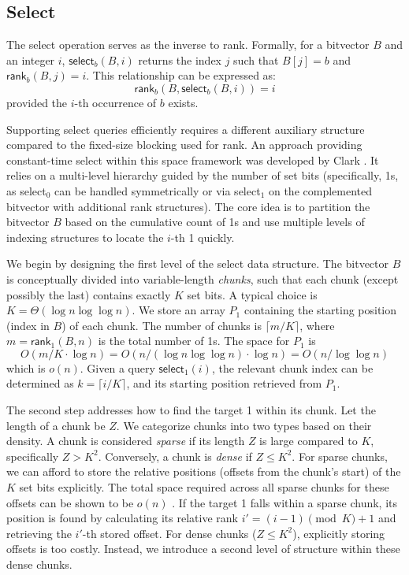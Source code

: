 \subsection{\textsf{Select}} \label{subsec:select}

The \textsf{select} operation serves as the inverse to \textsf{rank}. Formally, for a bitvector $B$ and an integer $i$, $\textsf{select}_b(B, i)$ returns the index $j$ such that $B[j] = b$ and $\textsf{rank}_b(B, j) = i$. This relationship can be expressed as:
\[ \textsf{rank}_b(B, \textsf{select}_b(B, i)) = i \]
provided the $i$-th occurrence of $b$ exists.

Supporting \textsf{select} queries efficiently requires a different auxiliary structure compared to the fixed-size blocking used for \textsf{rank}. An approach providing constant-time select within this space framework was developed by Clark \cite{clark1997compact}. It relies on a multi-level hierarchy guided by the number of set bits (specifically, 1s, as \textsf{select}$_0$ can be handled symmetrically or via \textsf{select}$_1$ on the complemented bitvector with additional rank structures). The core idea is to partition the bitvector $B$ based on the cumulative count of 1s and use multiple levels of indexing structures to locate the $i$-th 1 quickly.

We begin by designing the first level of the select data structure. The bitvector $B$ is conceptually divided into variable-length \emph{chunks}, such that each chunk (except possibly the last) contains exactly $K$ set bits. A typical choice is $K = \Theta(\log n \log \log n)$. We store an array $P_1$ containing the starting position (index in $B$) of each chunk. The number of chunks is $\lceil m/K \rceil$, where $m = \textsf{rank}_1(B, n)$ is the total number of 1s. The space for $P_1$ is
\[O(m/K \cdot \log n) = O(n / (\log n \log \log n) \cdot \log n) = O(n / \log \log n)\]
which is $o(n)$. Given a query $\textsf{select}_1(i)$, the relevant chunk index can be determined as $k = \lceil i/K \rceil$, and its starting position retrieved from $P_1$.

The second step addresses how to find the target 1 within its chunk. Let the length of a chunk be $Z$. We categorize chunks into two types based on their density. A chunk is considered \emph{sparse} if its length $Z$ is large compared to $K$, specifically $Z > K^2$. Conversely, a chunk is \emph{dense} if $Z \le K^2$. For sparse chunks, we can afford to store the relative positions (offsets from the chunk's start) of the $K$ set bits explicitly. The total space required across all sparse chunks for these offsets can be shown to be $o(n)$ \cite{clark1997compact}. If the target 1 falls within a sparse chunk, its position is found by calculating its relative rank $i' = (i-1) \pmod K + 1$ and retrieving the $i'$-th stored offset. For dense chunks ($Z \le K^2$), explicitly storing offsets is too costly. Instead, we introduce a second level of structure within these dense chunks.

